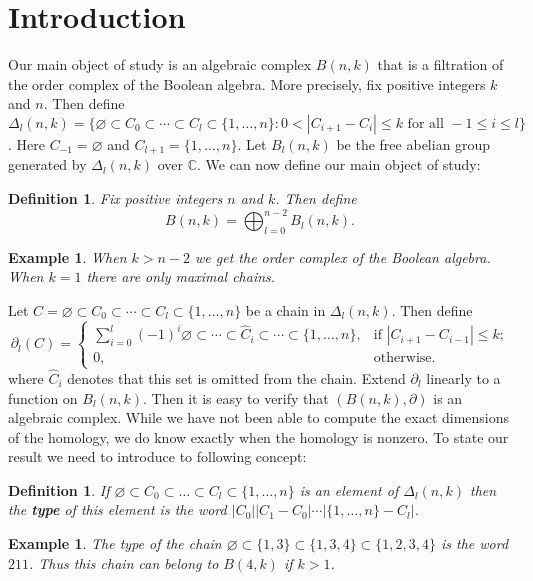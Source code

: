 \documentclass{amsart}
\newtheorem{definition}[theorem]{Definition}
\newtheorem{example}[theorem]{Example}
\newcommand{\C}{\mathbb{C}}
\newcommand{\full}{\{1, \ldots, n\}}
\begin{document}
\section{Introduction}\label{S:intro}

  Our main object of study is an algebraic complex $B(n, k)$ that is a filtration of the order complex of the 
Boolean algebra. More precisely, fix positive integers $k$ and $n$. Then define 
  $\Delta_l(n, k) = \{\varnothing \subset C_0 \subset \cdots \subset C_l \subset \{1, \ldots, n\}
  \colon 0 < |C_{i+1} - C_i| \le k 
  \mbox{ for all } -1 \le i \le l \}$. Here $C_{-1} = \varnothing$ and $C_{l+1} = \full$. Let $B_l(n, k)$ be the free abelian group generated by $\Delta_l(n, k)$ over $\C$.
We can now define our main object of study: 
\begin{definition}\label{:B(n,k)} Fix positive integers $n$ and $k$. Then define
  \begin{equation}
    B(n, k) = \bigoplus_{l=0}^{n-2} B_l(n, k).
  \end{equation}
\end{definition}
\begin{example} When $k > n-2$ we get the order complex of the Boolean algebra. When $k=1$ there are only maximal chains.
\end{example}
Let $C = \varnothing \subset C_0 \subset  \cdots \subset C_l \subset \{1, \ldots, n\}$ be a chain in $\Delta_l(n, k)$.
Then define
\begin{equation}\label{E:delta}
  \partial_l(C) = 
  \begin{cases}
     \sum_{i=0}^l (-1)^i \varnothing \subset \cdots \subset {\hat C_i} \subset \cdots  \subset \full, 
	 &\text{if $|C_{i+1} - C_{i-1}| \le k$;}\\
     0, &\text{otherwise.}
  \end{cases}
\end{equation} where ${\hat C_i}$ denotes that this set is omitted from the chain. 
Extend $\partial_l$ linearly to a function on $B_l(n, k)$. Then it is easy to verify that $(B(n, k), \partial)$
is an algebraic complex.  While we have not been able to compute the 
exact dimensions of the homology, we do know exactly when the homology is nonzero. To state our result we need to introduce to following
concept:
\begin{definition}\label{D:type}
If $\varnothing \subset C_0 \subset \ldots \subset C_l \subset \{1, \ldots, n\}$ is
           an element of $\Delta_l(n, k)$ then the {\bf type} of this element is the word 
           $|C_0||C_1 - C_0|\cdots|\full - C_l|$.
\end{definition}
\begin{example} The type of the chain $\varnothing \subset \{1, 3\} \subset \{1, 3, 4\} \subset \{1, 2,3, 4\}$ is the word
$211$. Thus this chain can belong to $B(4, k)$ if $k >1$.
\end{example}
\end{document}
